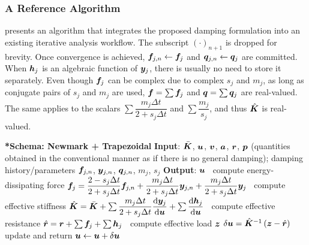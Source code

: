 \subsubsection{A Reference Algorithm}
 presents an algorithm that integrates the proposed damping formulation into an existing iterative analysis workflow.
The subscript $\left(\cdot\right)_{n+1}$ is dropped for brevity.
Once convergence is achieved, $\bm{f}_{j,n}\leftarrow\bm{f}_j$ and $\bm{q}_{j,n}\leftarrow\bm{q}_j$ are committed.
When $\bm{h}_j$ is an algebraic function of $\bm{y}_j$, there is usually no need to store it separately.
Even though $\bm{f}_j$ can be complex due to complex $s_j$ and $m_j$, as long as conjugate pairs of $s_j$ and $m_j$ are used, $\bm{f}=\sum\bm{f}_j$ and $\bm{q}=\sum\bm{q}_j$ are real-valued.
The same applies to the scalars $\sum\dfrac{m_j\Delta{}t}{2+s_j\Delta{}t}$ and $\sum\dfrac{m_j}{s_j}$, and thus $\hat{\bm{K}}$ is real-valued.
\begin{breakablealgorithm}
    \caption{iteration body of solving dynamic systems with general damping}\label{algo:general_algo}
    \begin{algorithmic}
        \State \textbf{*Schema: Newmark + Trapezoidal}
        \State \textbf{Input}: $\bar{\bm{K}}$, $\bm{u}$, $\bm{v}$, $\bm{a}$, $\bm{r}$, $\bm{p}$ (quantities obtained in the conventional manner as if there is no general damping); damping history/parameters $\bm{f}_{j,n}$, $\bm{y}_{j,n}$, $\bm{q}_{j,n}$, $m_j$, $s_j$
        \State \textbf{Output}: $\bm{u}$
        \State \faMicrochip~compute energy-dissipating force $\bm{f}_{j}=\dfrac{2-s_j\Delta{}t}{2+s_j\Delta{}t}\bm{f}_{j,n}+\dfrac{m_j\Delta{}t}{2+s_j\Delta{}t}\bm{y}_{j,n}+\dfrac{m_j\Delta{}t}{2+s_j\Delta{}t}\bm{y}_{j}$
        \State \faMicrochip~compute effective stiffness $\hat{\bm{K}}=\bar{\bm{K}}+\sum\dfrac{m_j\Delta{}t}{2+s_j\Delta{}t}\dfrac{\mathrm{d}\bm{y}_{j}}{\mathrm{d}\bm{u}}+\sum\dfrac{\mathrm{d}\bm{h}_j}{\mathrm{d}\bm{u}}$
        \State \faMicrochip~compute effective resistance $\hat{\bm{r}}=\bm{r}+\sum\bm{f}_j+\sum\bm{h}_j$
        \State \faMicrochip~compute effective load $\bm{z}$
        \State $\delta\bm{u}=\hat{\bm{K}}^{-1}\left(\bm{z}-\hat{\bm{r}}\right)$
        \State update and return $\bm{u}\leftarrow\bm{u}+\delta\bm{u}$
    \end{algorithmic}
\end{breakablealgorithm}
